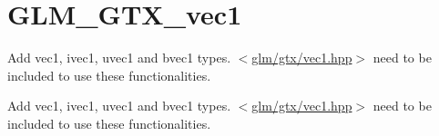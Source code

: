 \hypertarget{group__gtx__vec1}{}\section{G\+L\+M\+\_\+\+G\+T\+X\+\_\+vec1}
\label{group__gtx__vec1}


Add vec1, ivec1, uvec1 and bvec1 types. $<$\hyperlink{vec1_8hpp}{glm/gtx/vec1.\+hpp}$>$ need to be included to use these functionalities.  


Add vec1, ivec1, uvec1 and bvec1 types. $<$\hyperlink{vec1_8hpp}{glm/gtx/vec1.\+hpp}$>$ need to be included to use these functionalities. 

